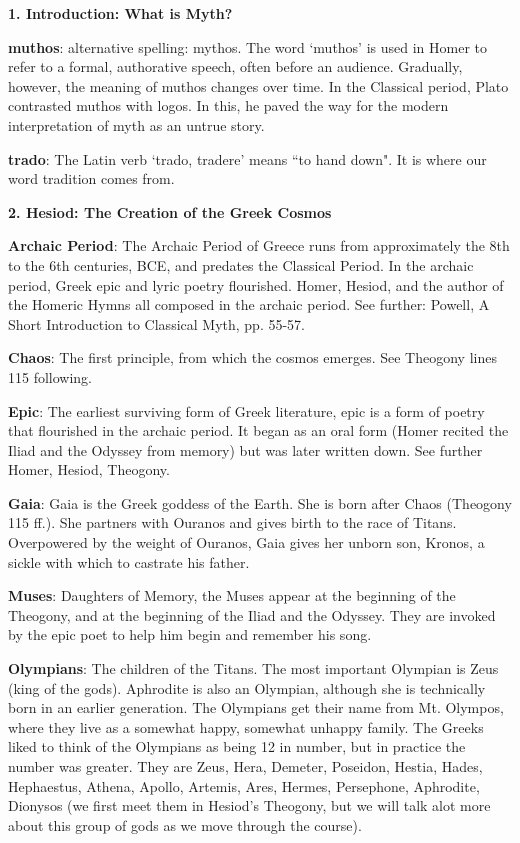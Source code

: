 \documentclass{scrartcl}
\begin{document}
\raggedright
\begin{multicols*}{3}


{\bf 1. Introduction: What is Myth?}

{\bf muthos}: alternative spelling: mythos. The word `muthos' is used in Homer to refer to a formal, authorative speech, often before an audience. Gradually, however, the meaning of muthos changes over time. In the Classical period, Plato contrasted muthos with logos. In this, he paved the way for the modern interpretation of myth as an untrue story.

{\bf trado}: The Latin verb `trado, tradere' means ``to hand down". It is where our word tradition comes from.


{\bf 2. Hesiod: The Creation of the Greek Cosmos}

{\bf Archaic Period}: The Archaic Period of Greece runs from approximately the 8th to the 6th centuries, BCE, and predates the Classical Period. In the archaic period, Greek epic and lyric poetry flourished. Homer, Hesiod, and the author of the Homeric Hymns all composed in the archaic period. See further: Powell, A Short Introduction to Classical Myth, pp. 55-57.

{\bf Chaos}: The first principle, from which the cosmos emerges. See Theogony lines 115 following.

{\bf Epic}: The earliest surviving form of Greek literature, epic is a form of poetry that flourished in the archaic period. It began as an oral form (Homer recited the Iliad and the Odyssey from memory) but was later written down. See further Homer, Hesiod, Theogony.

{\bf Gaia}: Gaia is the Greek goddess of the Earth. She is born after Chaos (Theogony 115 ff.). She partners with Ouranos and gives birth to the race of Titans. Overpowered by the weight of Ouranos, Gaia gives her unborn son, Kronos, a sickle with which to castrate his father.

{\bf Muses}: Daughters of Memory, the Muses appear at the beginning of the Theogony, and at the beginning of the Iliad and the Odyssey. They are invoked by the epic poet to help him begin and remember his song.

{\bf Olympians}: The children of the Titans. The most important Olympian is Zeus (king of the gods). Aphrodite is also an Olympian, although she is technically born in an earlier generation. The Olympians get their name from Mt. Olympos, where they live as a somewhat happy, somewhat unhappy family. The Greeks liked to think of the Olympians as being 12 in number, but in practice the number was greater. They are Zeus, Hera, Demeter, Poseidon, Hestia, Hades, Hephaestus, Athena, Apollo, Artemis, Ares, Hermes, Persephone, Aphrodite, Dionysos (we first meet them in Hesiod's Theogony, but we will talk alot more about this group of gods as we move through the course).


\end{multicols*}
\end{document}
